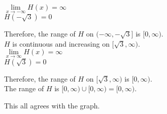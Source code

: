 \documentclass{ximera}
\begin{document}
$\lim\limits_{x \to -\infty} H(x) = \infty$ \\


$H(-\sqrt{3}) = 0$


Therefore, the range of $H$ on $( -\infty, -\sqrt{3} ]$ is $[0, \infty)$. \\





$H$ is continuous and increasing on $[ \sqrt{3} ,\infty)$. \\


$\lim\limits_{x \to \infty} H(x) = \infty$ \\


$H(\sqrt{3}) = 0$


Therefore, the range of $H$ on $[ \sqrt{3}, \infty )$ is $[0, \infty)$. \\








The range of $H$ is $[0, \infty) \cup [0, \infty) = [0, \infty)$.




This all agrees with the graph. \\
\end{document}
